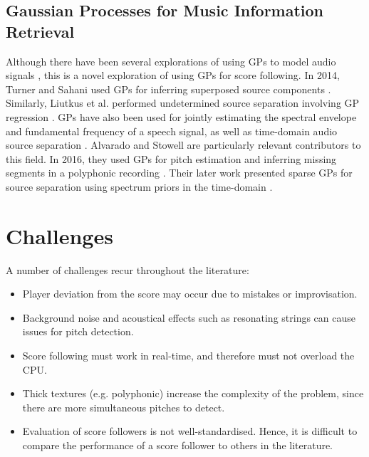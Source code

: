 \subsection{Gaussian Processes for Music Information Retrieval}
Although there have been several explorations of using GPs to model audio signals \cite{alvarado_2016_gaussian}\cite{wilkinson_2019_gaussian}, this is a novel exploration of using GPs for score following. In 2014, Turner and Sahani used GPs for inferring superposed source components \cite{turner_2014_timefrequency}. Similarly, Liutkus et al. performed undetermined source separation involving GP regression \cite{liutkus_2011_gaussian}. GPs have also been used for jointly estimating the spectral envelope and fundamental frequency of a speech signal, as well as time-domain audio source separation \cite{yoshii_2015_masataka}\cite{yoshii_2013_beyond}. Alvarado and Stowell are particularly relevant contributors to this field. In 2016, they used GPs for pitch estimation and inferring missing segments in a polyphonic recording \cite{alvarado_2016_gaussian}. Their later work presented sparse GPs for source separation using spectrum priors in the time-domain \cite{miscdo_2019_sparse}.



 \section{Challenges}{\label{section:challenges}}
A number of challenges recur throughout the literature:
\begin{itemize}
    \item Player deviation from the score may occur due to mistakes or improvisation. 

    \item Background noise and acoustical effects such as resonating strings can cause issues for pitch detection. 
    \item Score following must work in real-time, and therefore must not overload the CPU. 
    \item Thick \gls{texture}s (e.g. \gls{polyphonic}) increase the complexity of the problem, since there are more simultaneous pitches to detect. 
    \item Evaluation of score followers is not well-standardised. Hence, it is difficult to compare the performance of a score follower to others in the literature.   
\end{itemize}

